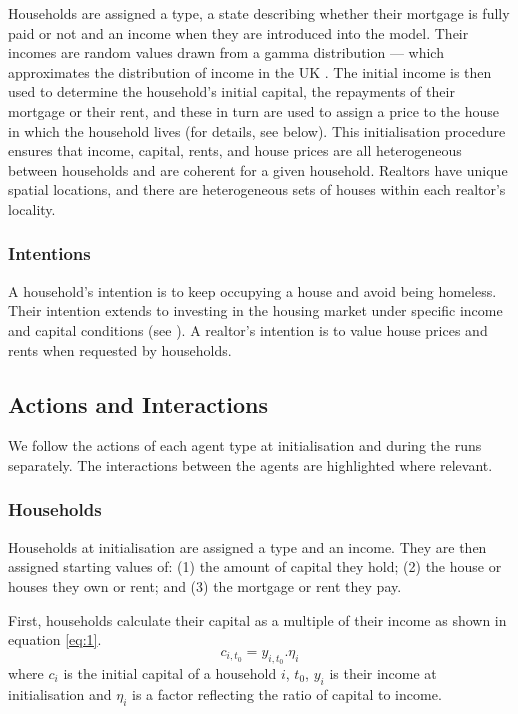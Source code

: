 Households are assigned a type, a state describing whether their mortgage is fully paid or not and an income when they are introduced into the model. Their incomes are random values drawn from a gamma distribution --- which approximates the distribution of income in the UK \citep{ONS2024population}. The initial income is then used to determine the household's initial capital, the repayments of their mortgage or their rent, and these in turn are used to assign a price to the house in which the household lives (for details, see below). This initialisation procedure ensures that income, capital, rents, and house prices are all heterogeneous between households and are coherent for a given household. Realtors have unique spatial locations, and there are heterogeneous sets of houses within each realtor's locality.

\subsubsection{Intentions} \label{Intentions}
A household's intention is to keep occupying a house and avoid being homeless. Their intention extends to investing in the housing market under specific income and capital conditions (see ). A realtor's intention is to value house prices and rents when requested by households.

\subsection{Actions and Interactions} \label{Actions and Interactions}

We follow the actions of each agent type at initialisation and during the runs separately. The interactions between the agents are highlighted where relevant.

\subsubsection{Households}

Households at initialisation are assigned a type and an income. They are then assigned starting values of: (1) the amount of capital they hold; (2) the house or houses they own or rent; and (3) the mortgage or rent they pay. 

First, households calculate their capital as a multiple of their income as shown in equation \ref{eq:1}.
\begin{equation} \label{eq:1}
    c_{i,t_0} = y_{i,t_0} . \eta_i
\end{equation}
where \(c_{i}\) is the initial capital of a household \(i\), \(t_0\), \(y_i\) is their income at initialisation and \(\eta_i\) is a factor reflecting the ratio of capital to income.

